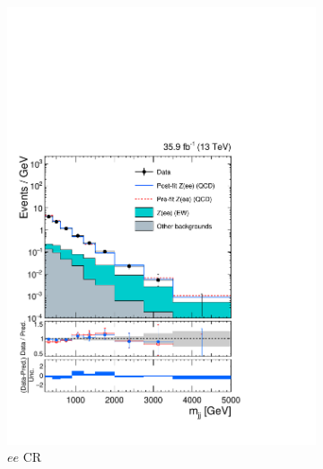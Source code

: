 \begin{figure}[]
\begin{center}
\begin{subfigure}[t]{0.32\textwidth}
            \includegraphics[width=\textwidth]{figures/vbf/fits/vbf_PULLS_prefit_postfit_dielectron.pdf}
            \caption{$ee$ CR}
        \end{subfigure} \\ 
        \begin{subfigure}[t]{0.32\textwidth}

\end{subfigure}
\end{center}
\end{figure}
